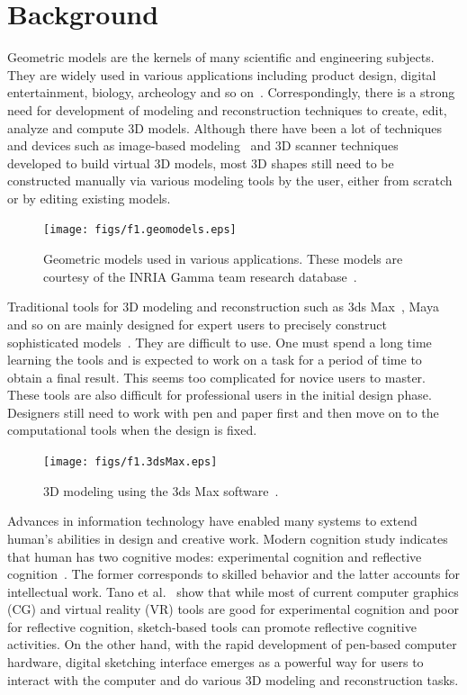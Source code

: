 \section{Background}\label{ch1:sec:background}

Geometric models are the kernels of many scientific and engineering
subjects. They are widely used in various applications including
product design, digital entertainment, biology, archeology and so
on~\cite{BPKALBR07}. Correspondingly, there is a strong need for
development of modeling and reconstruction techniques to create,
edit, analyze and compute 3D models. Although there
have been a lot of techniques and devices such as image-based modeling~\cite{DTM96,LTZYWK06} and 3D scanner techniques~\cite{LPCRK00,ZSCS04}
developed to build virtual 3D models, most 3D shapes still need to
be constructed manually via various modeling tools by the user,
either from scratch or by editing existing models.

\begin{figure} [htbp]
    \centering
  \texttt{[image: figs/f1.geomodels.eps]}
  \caption{Geometric models used in various applications. These models are courtesy of the INRIA Gamma team research database~\cite{INRIA}.}
\end{figure}

Traditional tools for 3D modeling and reconstruction such as 3ds Max~\cite{3DSMAX}, Maya~\cite{MAYA} and so on are mainly
designed for expert users to precisely construct sophisticated
models~\cite{CIW08}. They are difficult to use. One must spend a long time
learning the tools and is expected to work on a task for a period of
time to obtain a final result. This seems too complicated for novice
users to master. These tools are also difficult for professional
users in the initial design phase. Designers still need to work with
pen and paper first and then move on to the computational tools when
the design is fixed.

\begin{figure} [htbp]
    \centering
  \texttt{[image: figs/f1.3dsMax.eps]}
  \caption{3D modeling using the 3ds Max software~\cite{3DSMAX}.}
\end{figure}

Advances in information technology have  enabled many systems to
extend human's abilities in design and creative work. Modern
cognition study indicates that human has two cognitive modes:
experimental cognition and reflective cognition~\cite{DN98}. The
former corresponds to skilled behavior and the latter accounts for
intellectual work. Tano et al.~\cite{TKNK03} show that while most of
current computer graphics (CG) and virtual reality (VR) tools are
good for experimental cognition and poor for reflective cognition,
sketch-based tools can promote reflective cognitive activities. On
the other hand, with the rapid development of pen-based computer
hardware, digital sketching interface emerges as a powerful way for
users to interact with the computer and do various 3D modeling and
reconstruction tasks.


